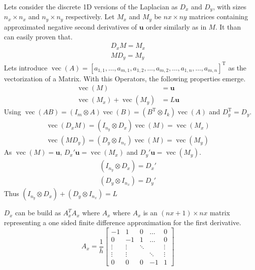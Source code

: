 \documentclass{article}
\begin{document}
Lets consider the discrete 1D versions of the Laplacian as $D_x$ and $D_y$, with sizes $n_x \times n_x$ and $n_y \times n_y$ respectively.
Let $M_x$ and $M_y$ be $nx\times ny$ matrices containing approximated negative second derivatives of $\mathbf{u}$ order similarly as in $M$. It than can easily proven that.
\begin{align}
    D_x M = M_x \\
    M D_y = M_y
\end{align}
Lets introduce $\operatorname{vec}(A)=\left[a_{1,1}, \ldots, a_{m, 1}, a_{1,2}, \ldots, a_{m, 2}, \ldots, a_{1, n}, \ldots, a_{m, n}\right]^{\mathrm{T}}$ as the vectorization of a Matrix. With this Operators, the following properties emerge.
\begin{align}
    \operatorname{vec}(M) &= \mathbf{u} \\
    \operatorname{vec}(M_x) + \operatorname{vec}(M_y) &= L\mathbf{u}
\end{align}
Using $\operatorname{vec}(A B)=\left(I_{m} \otimes A\right) \operatorname{vec}(B)=\left(B^{\mathrm{T}} \otimes I_{k}\right) \operatorname{vec}(A)$ and $D_y^{\mathrm{T}} = D_y$.
\begin{align}
    \operatorname{vec}(D_x M) = (I_{n_y} \otimes D_x)\operatorname{vec}(M) = \operatorname{vec}(M_x)\\
    \operatorname{vec}(M D_y) = (D_y \otimes I_{n_x})\operatorname{vec}(M) = \operatorname{vec}(M_y)
\end{align} 
As $\operatorname{vec}(M) = \mathbf{u}$, $D_x' \mathbf{u} = \operatorname{vec}(M_x)$ and $D_y' \mathbf{u} = \operatorname{vec}(M_y)$.
\begin{align}
    (I_{n_y} \otimes D_x) = D_x' \\
    (D_y \otimes I_{n_x}) = D_y'
\end{align}
Thus $(I_{n_y} \otimes D_x) + (D_y \otimes I_{n_x}) = L$\par
$D_x$ can be build as $A_x^T A_x$ where $A_x$ where $A_x$ is an $(nx+1) \times nx$ matrix representing a one sided finite difference approximation for the first derivative.
\begin{equation}
	 A_x = \frac{1}{h}\begin{bmatrix}
                -1 & 1 & 0&\dots & 0 \\
       		0&-1&1&\dots&0\\
			\vdots&\vdots&\ddots& &\vdots\\
\vdots&\vdots& &\ddots&\vdots\\
0&0&0&-1&1
\end{bmatrix}
\end{equation}
\end{document}
